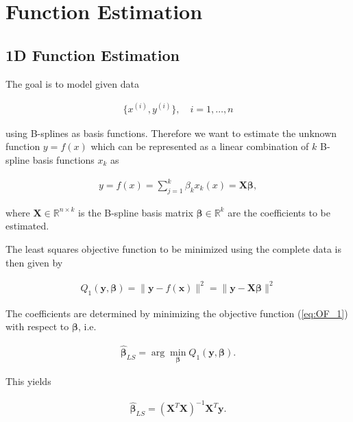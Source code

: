 \documentclass[10pt,a4paper]{article}
\begin{document}
	\section{Function Estimation}
	
	\subsection{1D Function Estimation} \label{1D}
 	 
 	The goal is to model given data
 	
 	\begin{align} \label{eq:data}
 		\{x^{(i)}, y^{(i)}\}, \quad i = 1, \dots, n 
 	\end{align}
 	
	using B-splines as basis functions. Therefore we want to estimate the unknown function $y = f(x)$ which can be represented as a linear combination of $k$ B-spline basis functions $x_k$ as
	
	\begin{align} \label{eq:basis_function_approach}
		y = f(x) = \sum_{j=1}^k \beta_k x_k(x) = \boldsymbol{X} \boldsymbol{\beta},
	\end{align}
	
	where $\boldsymbol{X} \in \mathbb{R}^{n\times k}$ is the B-spline basis matrix $\boldsymbol{\beta} \in \mathbb{R}^k$ are the coefficients to be estimated. 
	
 	The least squares objective function to be minimized using the complete data is then given by
	
	\begin{align} \label{eq:OF_1}
		Q_1(\boldsymbol{y}, \boldsymbol{\beta}) = \lVert \boldsymbol{y} - f(\boldsymbol{x}) \rVert^2 = \lVert \boldsymbol{y} - \boldsymbol{X}\boldsymbol{\beta} \rVert^2 
	\end{align}	
	
	The coefficients are determined by minimizing the objective function (\ref{eq:OF_1}) with respect to $\boldsymbol{\beta}$, i.e.
	
	\begin{align}\label{eq:optimization_problem_1}
		\boldsymbol{\hat \beta}_{LS} = \arg \min_{\boldsymbol{\beta}} Q_1(\boldsymbol{y}, \boldsymbol{\beta}).
	\end{align}
	
	This yields 
	
	\begin{align} \label{eq:LS_coef}
		\boldsymbol{\hat \beta}_{LS}= (\boldsymbol{X}^T \boldsymbol{X})^{-1} \boldsymbol{X}^T \boldsymbol{y}.
	\end{align} 
	
\end{document}
